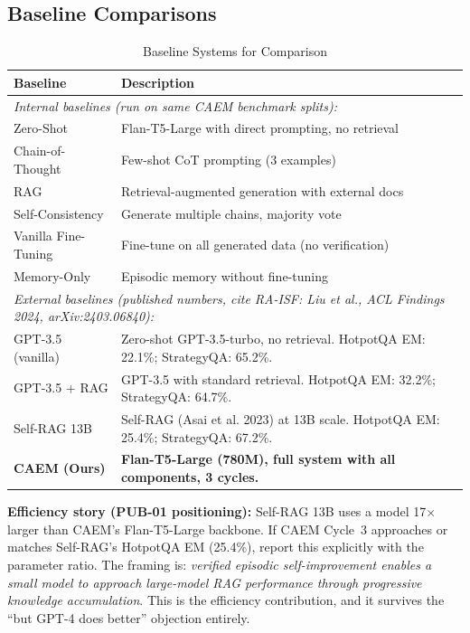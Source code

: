 \documentclass[12pt,a4paper]{article}
\theoremstyle{definition}
\begin{document}
\subsection{Baseline Comparisons}

\begin{table}[htbp]
\centering
\caption{Baseline Systems for Comparison}
\begin{tabular}{lp{8cm}}
\toprule
\textbf{Baseline} & \textbf{Description} \\
\midrule
\multicolumn{2}{l}{\textit{Internal baselines (run on same CAEM benchmark splits):}} \\
Zero-Shot & Flan-T5-Large with direct prompting, no retrieval \\
Chain-of-Thought & Few-shot CoT prompting (3 examples) \\
RAG & Retrieval-augmented generation with external docs \\
Self-Consistency & Generate multiple chains, majority vote \\
Vanilla Fine-Tuning & Fine-tune on all generated data (no verification) \\
Memory-Only & Episodic memory without fine-tuning \\
\midrule
\multicolumn{2}{l}{\textit{External baselines (published numbers, cite RA-ISF: Liu et al., ACL Findings 2024, arXiv:2403.06840):}} \\
GPT-3.5 (vanilla) & Zero-shot GPT-3.5-turbo, no retrieval. HotpotQA EM: 22.1\%; StrategyQA: 65.2\%. \\
GPT-3.5 + RAG & GPT-3.5 with standard retrieval. HotpotQA EM: 32.2\%; StrategyQA: 64.7\%. \\
Self-RAG 13B & Self-RAG (Asai et al. 2023) at 13B scale. HotpotQA EM: 25.4\%; StrategyQA: 67.2\%. \\
\midrule
\textbf{CAEM (Ours)} & \textbf{Flan-T5-Large (780M), full system with all components, 3 cycles.} \\
\bottomrule
\end{tabular}
\end{table}

\begin{keyinsightbox}
\textbf{Efficiency story (PUB-01 positioning):} Self-RAG 13B uses a model 17$\times$ larger than CAEM's Flan-T5-Large backbone. If CAEM Cycle~3 approaches or matches Self-RAG's HotpotQA EM (25.4\%), report this explicitly with the parameter ratio. The framing is: \textit{verified episodic self-improvement enables a small model to approach large-model RAG performance through progressive knowledge accumulation}. This is the efficiency contribution, and it survives the ``but GPT-4 does better'' objection entirely.
\end{keyinsightbox}
\end{document}
